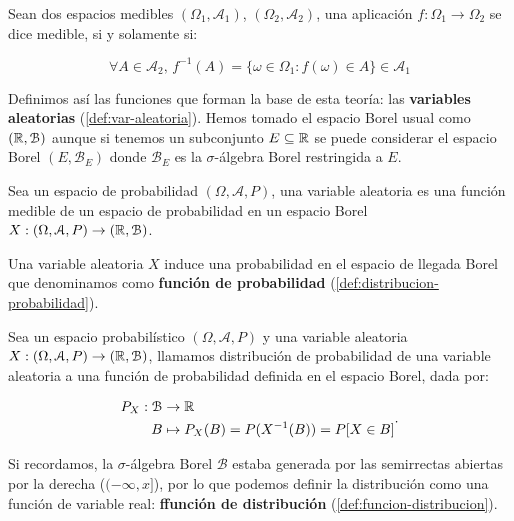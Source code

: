 \begin{definicion}
  Sean dos espacios medibles $(\Omega_1, \mathcal{A}_1)$, $(\Omega_2, \mathcal{A}_2)$, una aplicación $f : \Omega_1 \to \Omega_2$ se dice medible, si y solamente si:

  $$\forall A \in \mathcal{A}_2, \, f^{-1}(A) = \{\omega \in \Omega_1 : f(\omega) \in A\} \in \mathcal{A}_1$$
  \label{def:aplicacion-medible}
\end{definicion}

Definimos así las funciones que forman la base de esta teoría: las \textbf{variables aleatorias} (\autoref{def:var-aleatoria}). Hemos tomado el espacio Borel usual como $(\mathbb{R}, \mathcal{B})$ aunque si tenemos un subconjunto $E \subseteq \mathbb{R}$ se puede considerar el espacio Borel $(E, \mathcal{B}_E)$ donde $\mathcal{B}_E$ es la $\sigma$-álgebra Borel restringida a $E$.

\begin{definicion}
  Sea un espacio de probabilidad $(\Omega, \mathcal{A}, P)$, una variable aleatoria es una función medible de un espacio de probabilidad en un espacio Borel $X: (\Omega, \mathcal{A}, P) \to (\mathbb{R}, \mathcal{B})$.
  \label{def:var-aleatoria}
\end{definicion}

Una variable aleatoria $X$ induce una probabilidad en el espacio de llegada Borel que denominamos como \textbf{función de probabilidad} (\autoref{def:distribucion-probabilidad}).

\begin{definicion}
  Sea un espacio probabilístico $(\Omega, \mathcal{A}, P)$ y una variable aleatoria $X: (\Omega, \mathcal{A}, P) \to (\mathbb{R}, \mathcal{B})$, llamamos distribución de probabilidad de una variable aleatoria a una función de probabilidad definida en el espacio Borel, dada por:

  $$\begin{aligned} P_X : \mathcal{B} & \to \mathbb{R} \\
      B & \mapsto P_X(B) = P(X^{-1}(B)) = P[X \in B]
    \end{aligned}.$$
  \label{def:distribucion-probabilidad}
\end{definicion}

Si recordamos, la $\sigma$-álgebra Borel $\mathcal{B}$ estaba generada por las semirrectas abiertas por la derecha ($(-\infty, x]$), por lo que podemos definir la distribución como una función de variable real: \textbf{ffunción de distribución} (\autoref{def:funcion-distribucion}).

